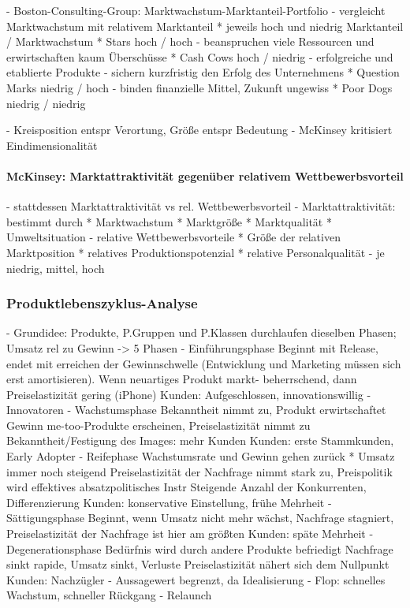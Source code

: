 {	- Boston-Consulting-Group: Marktwachstum-Marktanteil-Portfolio
		- vergleicht Marktwachstum mit relativem Marktanteil
		* jeweils hoch und niedrig
					Marktanteil	/ Marktwachstum
			* Stars			hoch	/ hoch
			 - beanspruchen viele Ressourcen und erwirtschaften
			   kaum Überschüsse
			* Cash Cows		hoch	/ niedrig
			 - erfolgreiche und etablierte Produkte
			 - sichern kurzfristig den Erfolg des Unternehmens
			* Question Marks	niedrig	/ hoch
			 - binden finanzielle Mittel, Zukunft ungewiss
			* Poor Dogs		niedrig	/ niedrig

		- Kreisposition entspr Verortung, Größe entspr Bedeutung
	- McKinsey kritisiert Eindimensionalität
	
\paragraph{McKinsey: Marktattraktivität gegenüber relativem Wettbewerbsvorteil}
		- stattdessen Marktattraktivität vs rel. Wettbewerbsvorteil
			- Marktattraktivität: bestimmt durch
			 * Marktwachstum
			 * Marktgröße
			 * Marktqualität
			 * Umweltsituation
			- relative Wettbewerbsvorteile
			 * Größe der relativen Marktposition
			 * relatives Produktionspotenzial
			 * relative Personalqualität
		- je niedrig, mittel, hoch

\subsubsection{Produktlebenszyklus-Analyse}
	- Grundidee: Produkte, P.Gruppen und P.Klassen durchlaufen dieselben
	 Phasen; Umsatz rel zu Gewinn -> 5 Phasen
		- Einführungsphase
			 Beginnt mit Release, endet mit erreichen der
			 Gewinnschwelle (Entwicklung und Marketing müssen sich
			 erst amortisieren). Wenn neuartiges Produkt markt-
			 beherrschend, dann Preiselastizität gering (iPhone)
				Kunden: Aufgeschlossen, innovationswillig
				- Innovatoren
		- Wachstumsphase
			 Bekanntheit nimmt zu, Produkt erwirtschaftet Gewinn
			 me-too-Produkte erscheinen, Preiselastizität nimmt zu
			 Bekanntheit/Festigung des Images: mehr Kunden
				Kunden: erste Stammkunden, Early Adopter
		- Reifephase
			 Wachstumsrate und Gewinn gehen zurück
			 * Umsatz immer noch steigend
			 Preiselastizität der Nachfrage nimmt stark zu,
			 Preispolitik wird effektives absatzpolitisches Instr
			 Steigende Anzahl der Konkurrenten, Differenzierung
				Kunden: konservative Einstellung,
					frühe Mehrheit
		- Sättigungsphase
			 Beginnt, wenn Umsatz nicht mehr wächst, Nachfrage
			 stagniert, Preiselastizität der Nachfrage ist hier am
			 größten
				Kunden: späte Mehrheit
		- Degenerationsphase
			 Bedürfnis wird durch andere Produkte befriedigt
			 Nachfrage sinkt rapide, Umsatz sinkt, Verluste
			 Preiselastizität nähert sich dem Nullpunkt
				Kunden: Nachzügler 
	- Aussagewert begrenzt, da Idealisierung
		- Flop: schnelles Wachstum, schneller Rückgang
		- Relaunch

}
